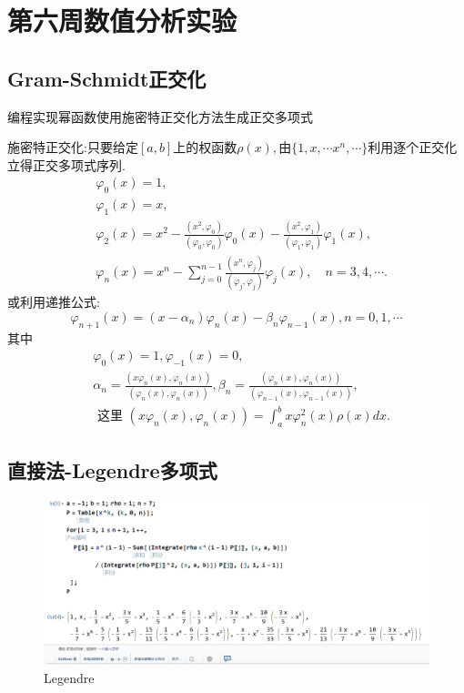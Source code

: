 \section{第六周数值分析实验}
\subsection{Gram-Schmidt正交化}
\begin{ex}
	编程实现幂函数使用施密特正交化方法生成正交多项式
	
	施密特正交化:只要给定$[a,b]$上的权函数$\rho \left( x \right),$由$\{1,x,\cdots x^n,\cdots \}$利用逐个正交化立得正交多项式序列.
	$$
	\begin{aligned}
		& \varphi_0(x)=1, \\
		& \varphi_1(x)=x, \\
		& \varphi_2(x)=x^2-\frac{\left(x^2, \varphi_0\right)}{\left(\varphi_0, \varphi_0\right)} \varphi_0(x)-\frac{\left(x^2, \varphi_1\right)}{\left(\varphi_1, \varphi_1\right)} \varphi_1(x), \\
		& \varphi_n(x)=x^n-\sum_{j=0}^{n-1} \frac{\left(x^n, \varphi_j\right)}{\left(\varphi_j, \varphi_j\right)} \varphi_j(x), \quad n=3,4, \cdots .
	\end{aligned}
	$$
	或利用递推公式:
	$$
	\varphi_{n+1}(x)=\left(x-\alpha_n\right) \varphi_n(x)-\beta_n \varphi_{n-1}(x), n=0,1, \cdots
	$$
	其中
	$$
	\begin{aligned}
		& \varphi_0(x)=1, \varphi_{-1}(x)=0, \\
		& \alpha_n=\frac{\left(x \varphi_n(x), \varphi_n(x)\right)}{\left(\varphi_n(x), \varphi_n(x)\right)}, \beta_n=\frac{\left(\varphi_n(x), \varphi_n(x)\right)}{\left(\varphi_{n-1}(x), \varphi_{n-1}(x)\right)}, \\
		& \text { 这里 }\left(x \varphi_n(x), \varphi_n(x)\right)=\int_a^b x \varphi_n^2(x) \rho(x) d x .
	\end{aligned}
	$$
\end{ex}
%
\subsection{直接法-Legendre多项式}

\begin{figure}[H]
	\centering
	\includegraphics[width = 1\linewidth]{day6/fig1.png}
	\caption{Legendre}
\end{figure}
